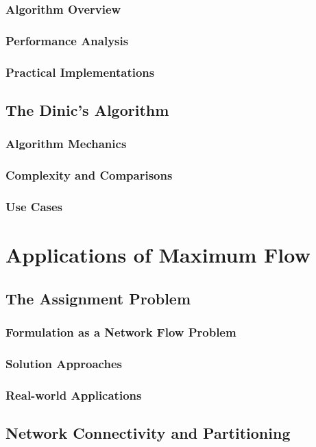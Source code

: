 \documentclass[12pt]{book} %
\begin{document}
\subsubsection{Algorithm Overview}
\subsubsection{Performance Analysis}
\subsubsection{Practical Implementations}
\subsection{The Dinic's Algorithm}
\subsubsection{Algorithm Mechanics}
\subsubsection{Complexity and Comparisons}
\subsubsection{Use Cases}

\section{Applications of Maximum Flow}
\subsection{The Assignment Problem}
\subsubsection{Formulation as a Network Flow Problem}
\subsubsection{Solution Approaches}
\subsubsection{Real-world Applications}
\subsection{Network Connectivity and Partitioning}
\end{document}
